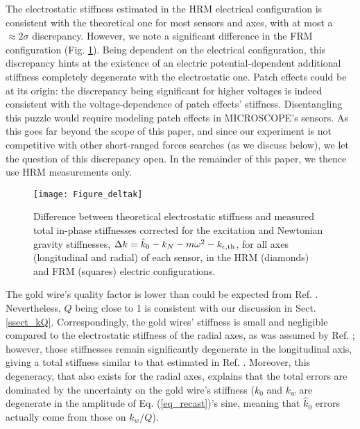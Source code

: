 \documentclass[12pt]{iopart}
\begin{document}
The electrostatic stiffness estimated in the HRM electrical configuration is consistent with the theoretical one for most sensors and axes, with at most a $\approx 2\sigma$ discrepancy. However, we note a significant difference in the FRM configuration (Fig. \ref{fig_deltak}). Being dependent on the electrical configuration, this discrepancy hints at the existence of an electric potential-dependent additional stiffness completely degenerate with the electrostatic one. Patch effects could be at its origin: the discrepancy being significant for higher voltages is indeed consistent with the voltage-dependence of patch effects' stiffness. Disentangling this puzzle would require modeling patch effects in MICROSCOPE's sensors. As this goes far beyond the scope of this paper, and since our experiment is not competitive with other short-ranged forces searches (as we discuss below), we let the question of this discrepancy open. In the remainder of this paper, we thence use HRM measurements only.

\begin{figure}%
\begin{center}
\texttt{[image: Figure\_deltak]}
\caption{Difference between theoretical electrostatic stiffness and measured total in-phase stiffnesses corrected for the excitation and Newtonian gravity stiffnesses, $\Delta k = \hat{k}_0 - k_N - m \omega^2 - k_{\epsilon, {\rm th}}$, for all axes (longitudinal and radial) of each sensor, in the HRM (diamonds) and FRM (squares) electric configurations.}
\label{fig_deltak}
\end{center}
\end{figure}

The gold wire's quality factor is lower than could be expected from Ref. \cite{willemenot00}. Nevertheless, $Q$ being close to 1 is consistent with our discussion in Sect. \ref{ssect_kQ}. Correspondingly, the gold wires' stiffness is small and negligible compared to the electrostatic stiffness of the radial axes, as was assumed by Ref. \cite{chhuncqg5}; however,  those stiffnesses remain significantly degenerate in the longitudinal axis, giving a total stiffness similar to that estimated in Ref. \cite{chhuncqg5}.
Moreover, this degeneracy, that also exists for the radial axes, explains that the total errors are dominated by the uncertainty on the gold wire's stiffness ($k_0$ and $k_w$ are degenerate in the amplitude of Eq. (\ref{eq_recast})'s sine, meaning that $\hat{k}_0$ errors actually come from those on $k_w/Q$).
\end{document}
